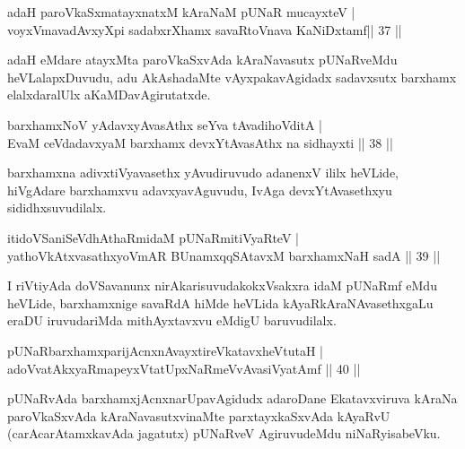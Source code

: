 
\begin{shl} 
adaH paroVkaSxmatayxnatxM kAraNaM pUNaR mucayxteV  | \\
voyxVmavadAvxyXpi sadabxrXhamx savaRtoV\s nava KaNiDxtamf\hfill|| 37 ||
\end{shl}

\begin{artha}
adaH eMdare atayxMta paroVkaSxvAda kAraNavasutx pUNaRveMdu heVLalapxDuvudu, adu AkAshadaMte vAyxpakavAgidadx sadavxsutx barxhamx elalxdaralUlx aKaMDavAgirutatxde.
\end{artha}

\begin{shl}
barxhamxNoV yA\s davxyAvasAthx seYva tAvadihoVditA  | \\
EvaM ceVdadavxyaM barxhamx devxYtAvasAthx na sidhayxti \hfill||  38 ||  
\end{shl}

\begin{artha}
barxhamxna adivxtiVyavasethx yAvudiruvudo adanenxV ililx heVLide, hiVgAdare barxhamxvu adavxyavAguvudu, IvAga devxYtAvasethxyu sididhxsuvudilalx.
\end{artha}

\begin{shl}
itidoVSaniSeVdhAthaRmidaM pUNaRmitiVyaRteV  | \\
yathoVkAtxvasathxyoVmAR BUnamxqqSAtavxM barxhamxNaH sadA \hfill||  39 ||  
\end{shl}

\begin{artha}
I riVtiyAda doVSavanunx nirAkarisuvudakokxVsakxra idaM pUNaRmf eMdu heVLide, barxhamxnige savaRdA hiMde heVLida kAyaRkAraNAvasethxgaLu eraDU iruvudariMda mithAyxtavxvu eMdigU baruvudilalx.
\end{artha}

\begin{shl}
pUNaRbarxhamxparijAcnxnAvayxtireVkatavxheVtutaH  | \\
adoVvatAkxyaRmapeyxVtatUpxNaRmeVvAvasiVyatAmf \hfill||  40 ||  
\end{shl}

\begin{artha}
pUNaRvAda barxhamxjAcnxnarUpavAgidudx adaroDane Ekatavxviruva kAraNa paroVkaSxvAda kAraNavasutxvinaMte parxtayxkaSxvAda kAyaRvU (carAcarAtamxkavAda jagatutx) pUNaRveV AgiruvudeMdu niNaRyisabeVku.
\end{artha}

